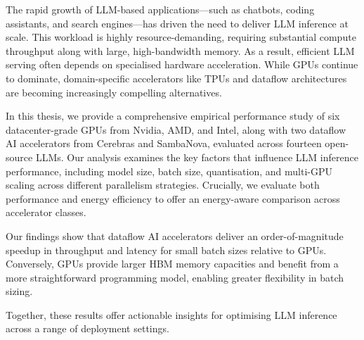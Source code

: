 \summary

The rapid growth of LLM-based applications—such as chatbots, coding assistants, and search engines—has driven the need to deliver LLM inference at scale. This workload is highly resource-demanding, requiring substantial compute throughput along with large, high-bandwidth memory. As a result, efficient LLM serving often depends on specialised hardware acceleration. While GPUs continue to dominate, domain-specific accelerators like TPUs and dataflow architectures are becoming increasingly compelling alternatives.

In this thesis, we provide a comprehensive empirical performance study of six datacenter-grade GPUs from Nvidia, AMD, and Intel, along with two dataflow AI accelerators from Cerebras and SambaNova, evaluated across fourteen open-source LLMs.
Our analysis examines the key factors that influence LLM inference performance, including model size, batch size, quantisation, and multi-GPU scaling across different parallelism strategies. Crucially, we evaluate both performance and energy efficiency to offer an energy-aware comparison across accelerator classes. 

Our findings show that dataflow AI accelerators deliver an order-of-magnitude speedup in throughput and latency for small batch sizes relative to GPUs. Conversely, GPUs provide larger HBM memory capacities and benefit from a more straightforward programming model, enabling greater flexibility in batch sizing.

Together, these results offer actionable insights for optimising LLM inference across a range of deployment settings.